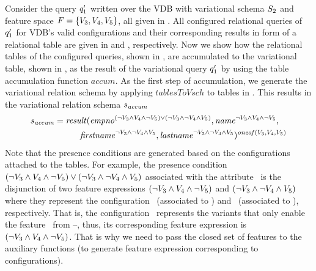 

\begin{example}
\label{eg:acc-table-from-conf}
Consider the query $\VVal {\vQ_1}$ written over the VDB with variational schema $\vSch_2$ and 
feature space $\features = \setDef {\vThree, \vFour, \vFive}$, all given in . 
%
All configured relational queries of $\VVal {\vQ_1}$ for VDB's valid configurations and their
corresponding results in form of a relational table are given
in  and , respectively. 
%
Now we show how the relational tables of the configured queries, shown in , are accumulated 
to the variational table, shown in , as the result of the variational query $\VVal \vQ_1$ by 
using the table accumulation function $\mathit{accum}$.
%
As the first step of accumulation, we generate the variational relation schema by
applying $\mathit{tablesToVsch}$ to tables in . 
This results in the variational relation schema $\vRelSch_{\mathit{accum}}$
%
\begin{alignat*}{1}
\vRelSch_{\mathit{accum}} &= \mathit{result} (\annot [(\neg \vThree \wedge \vFour \wedge \neg \vFive)\vee(\neg \vThree \wedge \neg \vFour \wedge \vFive)] \empno, \annot [\neg \vThree \wedge \vFour \wedge \neg \vFive] \name,\\
&\hspace{30pt}\annot [\neg \vThree \wedge \neg \vFour \wedge \vFive] \fname, \annot [\neg \vThree \wedge \neg \vFour \wedge \vFive] \lname)^{\oneof {\vThree,\vFour,\vFive}}
\end{alignat*}
%
\noindent
Note that the presence conditions are generated based on the configurations attached to
the tables. For example, the presence condition $(\neg \vThree \wedge \vFour \wedge \neg \vFive)\vee(\neg \vThree \wedge \neg \vFour \wedge \vFive)$ associated with the attribute \empno\
is the disjunction of  two feature expressions $(\neg \vThree \wedge \vFour \wedge \neg \vFive)$
and $(\neg \vThree \wedge \neg \vFour \wedge \vFive)$ where they represent the configuration
\setDef \vFour\ (associated to \tabref{vq-conf2}) and \setDef \vFive\ (associated to ),
respectively. That is, the configuration \setDef \vFour\ represents the variants that only enable the
feature \vFour\ from \vThree--\vFive, thus, its corresponding feature expression is $(\neg \vThree \wedge \vFour \wedge \neg \vFive)$. That is why we need to pass the closed set of features 
to the auxiliary functions (to generate feature expression corresponding to configurations).


\end{example}
